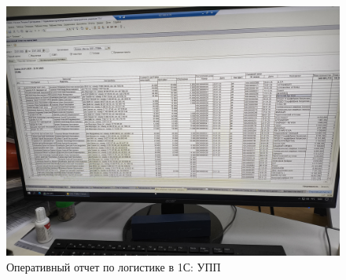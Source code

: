\begin{figure}
\begin{center}
 \includegraphics[height=0.4\textheight, keepaspectratio]{Pics/Х отчет по логистике.jpg}
\end{center}
 \caption{Оперативный отчет по логистике в 1С: УПП}
 \label{pic:Х отчет по логистике}
\end{figure}

\clearpage







